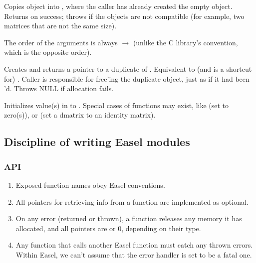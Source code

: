 \begin{sreitems}{}

\item[\ccode{\_Copy(src, dest)}]
Copies  object into , where the caller has
already created the empty  object. Returns 
on success; throws  if the objects are not
compatible (for example, two matrices that are not the same size).

The order of the arguments is always  $\rightarrow$
 (unlike the C library's  convention, which
is the opposite order).

\item[\ccode{\_Duplicate(obj)}] 

Creates and returns a pointer to a duplicate of .
Equivalent to (and is a shortcut for) . Caller is responsible for free'ing the duplicate
object, just as if it had been 'd. Throws NULL if
allocation fails.

\item[\ccode{\_Set*(obj, value...)}]

Initializes value(s) in  to . Special cases of
 functions may exist, like  (set to
zero(s)), or  (set a dmatrix to an
identity matrix).

\end{sreitems}


\subsection{Discipline of writing Easel modules}


\subsubsection{API}

\begin{enumerate}
\item Exposed function names obey Easel conventions.

\item All  pointers for retrieving info from 
      a function are implemented as optional.

\item On any error (returned or thrown), a function releases any
      memory it has allocated, and all  pointers are
       or 0, depending on their type.

\item Any function that calls another Easel function must 
      catch any thrown errors. Within Easel, we
      can't assume that the error handler is set to be a fatal
      one.
\end{enumerate}


